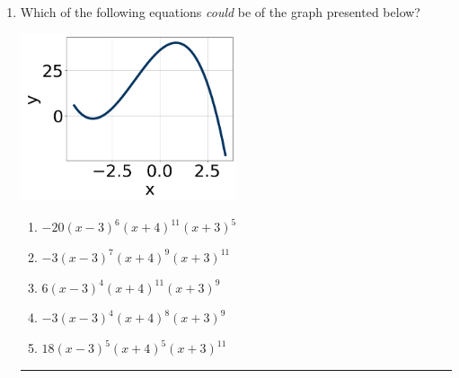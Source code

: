 \documentclass[14pt]{extbook}
\newcommand{\litem}[1]{\item#1\hspace*{-1cm}\rule{\textwidth}{0.4pt}}
\begin{document}
\begin{enumerate}
\litem{
Which of the following equations \textit{could} be of the graph presented below?
\begin{center}
    \includegraphics[width=0.5\textwidth]{../Figures/polyGraphToFunctionB.png}
\end{center}
\begin{enumerate}[label=\Alph*.]
\item \( -20(x - 3)^{6} (x + 4)^{11} (x + 3)^{5} \)
\item \( -3(x - 3)^{7} (x + 4)^{9} (x + 3)^{11} \)
\item \( 6(x - 3)^{4} (x + 4)^{11} (x + 3)^{9} \)
\item \( -3(x - 3)^{4} (x + 4)^{8} (x + 3)^{9} \)
\item \( 18(x - 3)^{5} (x + 4)^{5} (x + 3)^{11} \)


\end{enumerate}}
\end{enumerate}
\end{document}
